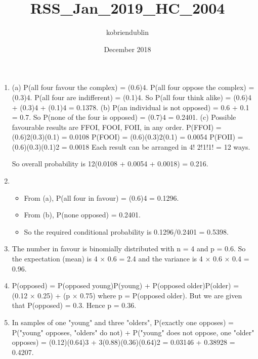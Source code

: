 \documentclass{article}
\title{RSS_Jan_2019_HC_2004}
\author{kobriendublin }
\date{December 2018}
\begin{document}
\begin{enumerate}

\item (a) P(all four favour the complex) = (0.6)4.
P(all four oppose the complex) = (0.3)4.
P(all four are indifferent) = (0.1)4.
So P(all four think alike) = (0.6)4 + (0.3)4 + (0.1)4 = 0.1378.
(b) P(an individual is not opposed) = 0.6 + 0.1 = 0.7.
So P(none of the four is opposed) = (0.7)4 = 0.2401.
(c) Possible favourable results are FFOI, FOOI, FOII, in any order.
P(FFOI) = (0.6)2(0.3)(0.1) = 0.0108
P(FOOI) = (0.6)(0.3)2(0.1) = 0.0054
P(FOII) = (0.6)(0.3)(0.1)2 = 0.0018
Each result can be arranged in 4!
2!1!1!
= 12 ways.

So overall probability is 12(0.0108 + 0.0054 + 0.0018) = 0.216.
\item \begin{itemize}
    \item From (a), P(all four in favour) = (0.6)4 = 0.1296.
    \item From (b), P(none
opposed) = 0.2401. 
\item So the required conditional probability is
0.1296/0.2401 = 0.5398.
\end{itemize} 
\item The number in favour is binomially distributed with n = 4 and p = 0.6. So the
expectation (mean) is 4 × 0.6 = 2.4 and the variance is 4 × 0.6 × 0.4 = 0.96.
\item P(opposed) = P(opposedyoung)P(young) + P(opposedolder)P(older)
= (0.12 × 0.25) + (p × 0.75)
where p = P(opposedolder). But we are given that P(opposed) = 0.3. Hence
p = 0.36.
\item In samples of one "young" and three "olders",
P(exactly one opposes) = P("young" opposes, "olders" do not)
+ P("young" does not oppose, one "older" opposes)
= {(0.12)(0.64)3} + {3(0.88)(0.36)(0.64)2} = 0.03146 + 0.38928 = 0.4207.
\end{enumerate}
\end{document}
